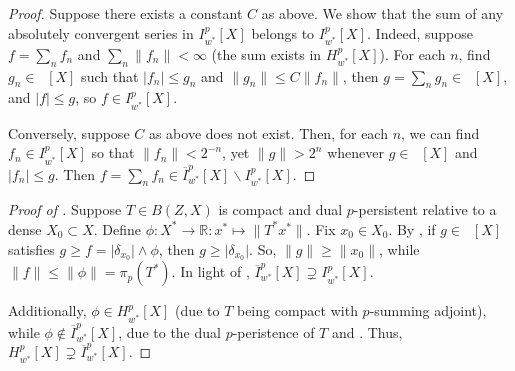 \documentclass{amsart}
\theoremstyle{plain}
\theoremstyle{definition}
\numberwithin{equation}{section}
\newcommand{\R}{\mathbb{R}}
\DeclareMathOperator{\FBLp}{FBL^{\mathit{(p)}}}
\newcommand{\Hp}{H_{w^*}^{p}}
\newcommand{\nip}{I_{w^*}^{p}}
\newcommand{\Ip}{\overline{I}_{w^*}^{p}}
\begin{document}
\begin{proof}
Suppose there exists a constant $C$ as above. We show that the sum of any absolutely convergent series in $\nip[X]$ belongs to $\nip[X]$. Indeed, suppose $f = \sum_n f_n$ and $\sum_n \|f_n\| < \infty$ (the sum exists in $\Hp[X]$).
For each $n$, find $g_n \in \FBLp[X]$ such that $|f_n| \leq g_n$ and $\|g_n\| \leq C \|f_n\|$, then $g = \sum_n g_n \in \FBLp[X]$, and $|f| \leq g$, so $f \in \nip[X]$.

Conversely, suppose $C$ as above does not exist. Then, for each $n$, we can find $f_n \in \nip[X]$ so that $\|f_n\| < 2^{-n}$, yet $\|g\| > 2^n$ whenever $g \in \FBLp[X]$ and $|f_n| \leq g$. Then $f = \sum_n f_n \in \Ip[X] \backslash \nip[X]$.
\end{proof}

\begin{proof}[Proof of ]
Suppose $T \in B(Z,X)$ is compact and dual $p$-persistent relative to a dense $X_0 \subset X$. Define $\phi : X^* \to \R : x^* \mapsto \|T^*x^*\|$. Fix $x_0 \in X_0$.
By , if $g \in \FBLp[X]$ satisfies $g \geq f = \big| \delta_{x_0} \big| \wedge \phi$, then $g \geq \big| \delta_{x_0} \big|$. So, $\|g\| \geq \|x_0\|$, while $\|f\| \leq \|\phi\| = \pi_p(T^*)$.
In light of , $\Ip[X] \supsetneq \nip[X]$.

Additionally, $\phi \in \Hp[X]$ (due to $T$ being compact with $p$-summing adjoint), while $\phi \notin \Ip[X]$, due to the dual $p$-peristence of $T$ and . Thus, $\Hp[X] \supsetneq \Ip[X]$.
\end{proof}
\end{document}
